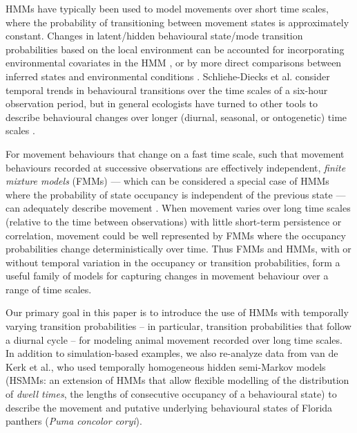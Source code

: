 \documentclass{bmcart}
\begin{document}
HMMs have typically been used to model movements over short time
scales, where the probability of transitioning between movement states is
approximately constant. Changes in latent/hidden behavioural state/mode transition 
probabilities based on
the local environment can be accounted for incorporating environmental
covariates in the HMM \cite{patterson_classifying_2009}, or by more
direct comparisons between inferred states and environmental
conditions \cite{fryxell_multiple_2008}. Schliehe-Diecks et al. 
\cite{schliehe-diecks_application_2012}
consider temporal trends in behavioural transitions over the
time scales of a six-hour
observation period, but
in general ecologists have turned to other tools to describe behavioural
changes over longer (diurnal, seasonal, or ontogenetic) time scales \cite{gurarie2009novel}.


For movement behaviours that change on a fast time scale, such
that movement behaviours recorded
at successive observations are effectively independent,
\emph{finite mixture models} (FMMs) --- which can be considered
a special case of HMMs where the
probability of state occupancy is independent of the previous state ---
can adequately describe movement \cite{tracey_mapping_2012}.  
When movement varies over long time scales
(relative to the time between observations) with little short-term
persistence or correlation, movement could be well represented by FMMs
where the occupancy probabilities change deterministically over time.
Thus FMMs and HMMs,
with or without temporal variation in the occupancy or transition
probabilities, form a useful family of models for capturing
changes in movement behaviour over a range of time scales.


Our primary goal in this paper is to introduce the use of
HMMs with temporally varying transition probabilities -- in particular,
transition probabilities that follow a diurnal cycle -- for modeling
animal movement recorded over long time scales.  
In addition to simulation-based examples,
we also re-analyze data from 
van de Kerk et al.\cite{kerk2015hidden}, who used temporally homogeneous hidden semi-Markov
models (HSMMs: an extension of HMMs that allow
flexible modelling of the distribution of \emph{dwell times}, the 
lengths of consecutive occupancy of a behavioural state) to
describe the movement and putative underlying
behavioural states of Florida panthers (\emph{Puma concolor coryi}).
\end{document}
